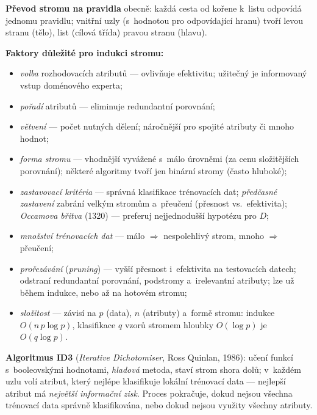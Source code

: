 \documentclass[11pt,a4paper]{article}
\theoremstyle{definition}
\begin{document}
\textbf{Převod stromu na pravidla} obecně: každá cesta od kořene k~listu odpovídá jednomu
pravidlu; vnitřní uzly (s~hodnotou pro odpovídající hranu) tvoří levou stranu (tělo),
list (cílová třída) pravou stranu (hlavu).

\textbf{Faktory důležité pro indukci stromu:}
\begin{itemize}
\item \emph{volba} rozhodovacích atributů --- ovlivňuje efektivitu; užitečný je informovaný
      vstup doménového experta;
\item \emph{pořadí} atributů --- eliminuje redundantní porovnání;
\item \emph{větvení} --- počet nutných dělení; náročnější pro spojité atributy či mnoho hodnot;
\item \emph{forma stromu} --- vhodnější vyvážené s~málo úrovněmi (za cenu složitějších
      porovnání); některé algoritmy tvoří jen binární stromy (často hluboké);
\item \emph{zastavovací kritéria} --- správná klasifikace trénovacích dat; \emph{předčasné
      zastavení} zabrání velkým stromům a~přeučení (přesnost vs.\ efektivita);
      \emph{Occamova břitva} (1320) --- preferuj nejjednodušší hypotézu pro $D$;
\item \emph{množství trénovacích dat} --- málo $\Rightarrow$ nespolehlivý strom, mnoho
      $\Rightarrow$ přeučení;
\item \emph{prořezávání} (\emph{pruning}) --- vyšší přesnost i~efektivita na testovacích datech;
      odstraní redundantní porovnání, podstromy a~irelevantní atributy; lze už během indukce,
      nebo až na hotovém stromu;
\item \emph{složitost} --- závisí na $p$ (data), $n$ (atributy) a~formě stromu: indukce
      $O(n\,p\log p)$, klasifikace $q$ vzorů stromem hloubky $O(\log p)$ je $O(q\log p)$.
\end{itemize}

\textbf{Algoritmus ID3} (\emph{Iterative Dichotomiser}, Ross Quinlan, 1986): učení funkcí
s~booleovskými hodnotami, \emph{hladová} metoda, staví strom shora dolů; v~každém uzlu volí
atribut, který nejlépe klasifikuje lokální trénovací data --- nejlepší atribut má
\emph{největší informační zisk}. Proces pokračuje, dokud nejsou všechna trénovací data
správně klasifikována, nebo dokud nejsou využity všechny atributy.
\end{document}
